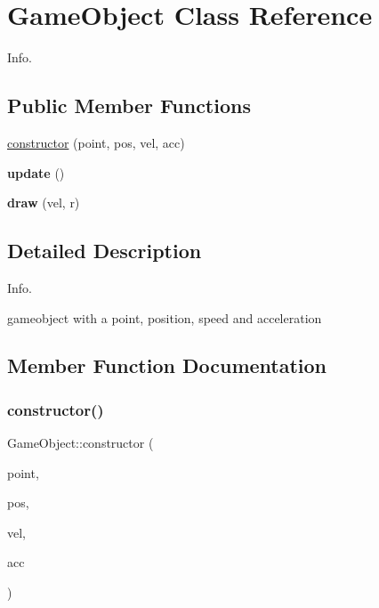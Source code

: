 \hypertarget{class_game_object}{}\section{Game\+Object Class Reference}
\label{class_game_object}


Info.  


\subsection*{Public Member Functions}
\begin{DoxyCompactItemize}
\item 
\mbox{\hyperlink{class_game_object_a278868f60e07b8561ff61c9068179052}{constructor}} (point, pos, vel, acc)
\item 
\mbox{\label{class_game_object_a35063e2df674d33aa208cb6032e0e648}} 
{\bfseries update} ()
\item 
\mbox{\label{class_game_object_ad4cede946b073a55061de1e05ea14d06}} 
{\bfseries draw} (vel, r)
\end{DoxyCompactItemize}


\subsection{Detailed Description}
Info. 

gameobject with a point, position, speed and acceleration 

\subsection{Member Function Documentation}
\mbox{\label{class_game_object_a278868f60e07b8561ff61c9068179052}} 
\subsubsection{\texorpdfstring{constructor()}{constructor()}}
{\footnotesize\ttfamily Game\+Object\+::constructor (\begin{DoxyParamCaption}\item[{}]{point,  }\item[{}]{pos,  }\item[{}]{vel,  }\item[{}]{acc }\end{DoxyParamCaption})\hspace{0.3cm}{\ttfamily [inline]}}


